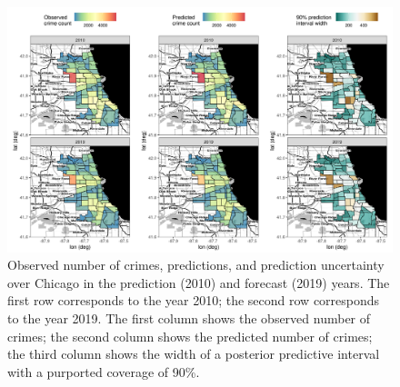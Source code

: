 \documentclass[nojss]{jss}
\begin{document}
\begin{figure}[t!]
    \centering
    \includegraphics[width = \linewidth]{img/Chicago_data_pred_uncertainty.png}
    \caption{Observed number of crimes, predictions, and prediction uncertainty over 
    Chicago in the prediction (2010) and forecast (2019) years. The first row corresponds to the year 2010; the second row corresponds to the year 2019. The first column shows the observed number of crimes; the second column shows the predicted number of crimes; the third column shows the width of a posterior predictive interval with a purported coverage of 90\%.%
}   
  \label{fig:chicago_validation_predictions}
\end{figure}
\end{document}
